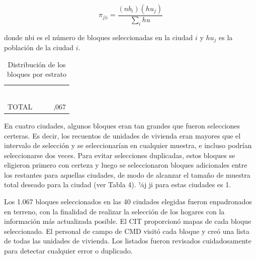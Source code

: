 \documentclass[
]{book}
\begin{document}
\[\pi_{j|i}=\frac{(nb_i)(hu_j)}{\sum_i hu}\]

donde nbi es el número de bloques seleccionadas en la ciudad \(i\) y \(hu_j\) es la población de la ciudad \(i\).

\begin{table}

\caption{\label{tab:unnamed-chunk-5}\label{tab:bloques}Distribución de los bloques por estrato}
\centering
\begin{tabular}[t]{>{\raggedright\arraybackslash}p{4cm}>{\raggedright\arraybackslash}p{3cm}>{\raggedright\arraybackslash}p{2cm}>{\raggedright\arraybackslash}p{2cm}}
\toprule
\cellcolor{white}{Estrato} & \cellcolor{white}{Definición (N° habitantes)} & \cellcolor{white}{n ciudades} & \cellcolor{white}{n bloques por ciudad}\\
\midrule
\cellcolor{white}{Gran Santiago} & \cellcolor{white}{} & \cellcolor{white}{1} & \cellcolor{white}{200}\\
\cellcolor{white}{Gran Valparaíso} & \cellcolor{white}{} & \cellcolor{white}{1} & \cellcolor{white}{100}\\
\cellcolor{white}{Gran Concepción} & \cellcolor{white}{} & \cellcolor{white}{1} & \cellcolor{white}{100}\\
\cellcolor{white}{Ciudades Grandes} & \cellcolor{white}{> 100 mil} & \cellcolor{white}{8} & \cellcolor{white}{26}\\
\cellcolor{white}{Ciudades Medianas} & \cellcolor{white}{> 30 mil} & \cellcolor{white}{10} & \cellcolor{white}{25}\\
\addlinespace
\cellcolor{white}{Ciudades Pequeñas} & \cellcolor{white}{> 10 mil} & \cellcolor{white}{19} & \cellcolor{white}{11}\\
TOTAL &  & 40 & 1,067\\
\bottomrule
\end{tabular}
\end{table}

En cuatro ciudades, algunos bloques eran tan grandes que fueron selecciones certeras. Es decir, los recuentos de unidades de vivienda eran mayores que el intervalo de selección y se seleccionarían en cualquier muestra, e incluso podrían seleccionarse dos veces. Para evitar selecciones duplicadas, estos bloques se eligieron primero con certeza y luego se seleccionaron bloques adicionales entre los restantes para aquellas ciudades, de modo de alcanzar el tamaño de muestra total deseado para la ciudad (ver Tabla 4). ¼j ji para estas ciudades es 1.

Los 1.067 bloques seleccionados en las 40 ciudades elegidas fueron enpadronados en terreno, con la finalidad de realizar la selección de los hogares con la información más actualizada posible. El CIT proporcionó mapas de cada bloque seleccionado. El personal de campo de CMD visitó cada bloque y creó una lista de todas las unidades de vivienda. Los listados fueron revisados cuidadosamente para detectar cualquier error o duplicado.
\end{document}
